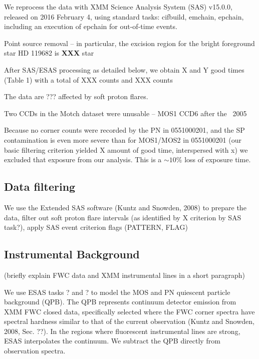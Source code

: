 \documentclass[twocolumn,tighten,trackchanges]{aastex6}
\newcommand*{\abt}{\mathord{\sim}} %
\begin{document}
We reprocess the data with XMM Science Analysis System (SAS) v15.0.0, released
on 2016 February 4, using standard tasks: cifbuild, emchain, epchain,
including an execution of epchain for out-of-time events.

Point source removal -- in particular, the excision region for the bright
foreground star HD 119682 is \textbf{XXX}
star

After SAS/ESAS processing as detailed below, we obtain X and Y good times
(Table 1) with a total of XXX counts and XXX counts

The data are ??? affected by soft proton flares.

Two CCDs in the Motch dataset were unusable -- MOS1 CCD6 after the ~2005

Because no corner counts were recorded by the PN in 0551000201,
and the SP contamination is even more severe than for MOS1/MOS2 in 0551000201
(our basic filtering criterion yielded X amount of good time, interspersed with
x)
we excluded that exposure from our analysis.  This is a $\abt 10\%$ loss of
exposure time.

\subsection{Data filtering}

We use the Extended SAS software (Kuntz and Snowden, 2008)
to prepare the data, filter out soft proton flare intervals (as identified by X
criterion by SAS task?),
apply SAS event criterion flags (PATTERN, FLAG)

\subsection{Instrumental Background}

(briefly explain FWC data and XMM instrumental lines in a short paragraph)

We use ESAS tasks ? and ? to model the MOS and PN quiescent particle background
(QPB).
The QPB represents continuum detector emission from XMM FWC closed data,
specifically selected where the FWC corner spectra have spectral hardness
similar to that of the current observation (Kuntz and Snowden, 2008, Sec. ??).
In the regions where fluorescent instrumental lines are strong, ESAS
interpolates the continuum.  We subtract the QPB directly from observation
spectra.
\end{document}
